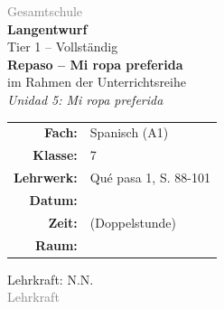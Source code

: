 \documentclass[11pt,a4paper]{article}
\newcommand{\fach}{Spanisch}
\newcommand{\jahrgangsstufe}{7}
\newcommand{\schulart}{Gesamtschule}
\newcommand{\stundenthema}{Repaso -- Mi ropa preferida}
\newcommand{\reihenthema}{Unidad 5: Mi ropa preferida}
\newcommand{\lehrkraft}{N.N.}
\newcommand{\ausbildungsstand}{Lehrkraft}
\newcommand{\gerniveau}{A1}
\newcommand{\lehrwerk}{Qué pasa 1}
\newcommand{\lehrwerkseite}{S. 88-101}
\begin{document}
\begin{titlepage}
    \centering
    \vspace*{2cm}

    {\large\textcolor{gray}{\schulart}}\\[2cm]

    {\Huge\textcolor{fach}{\textbf{Langentwurf}}}\\[0.5cm]
    {\large Tier 1 -- Vollständig}\\[2cm]

    {\LARGE\textbf{\stundenthema}}\\[0.5cm]
    {\large im Rahmen der Unterrichtsreihe}\\[0.3cm]
    {\Large\textit{\reihenthema}}\\[2cm]

    \begin{tabular}{rl}
        \textbf{Fach:} & \fach{} (\gerniveau) \\[0.3cm]
        \textbf{Klasse:} & \jahrgangsstufe \\[0.3cm]
        \textbf{Lehrwerk:} & \lehrwerk, \lehrwerkseite \\[0.3cm]
        \textbf{Datum:} & \underline{\hspace{3cm}} \\[0.3cm]
        \textbf{Zeit:} & \underline{\hspace{3cm}} (Doppelstunde) \\[0.3cm]
        \textbf{Raum:} & \underline{\hspace{3cm}} \\[0.3cm]
    \end{tabular}

    \vfill

    {\large Lehrkraft: \lehrkraft}\\[0.3cm]
    {\normalsize\textcolor{gray}{\ausbildungsstand}}\\[1cm]

\end{titlepage}

\tableofcontents
\newpage

\end{document}
